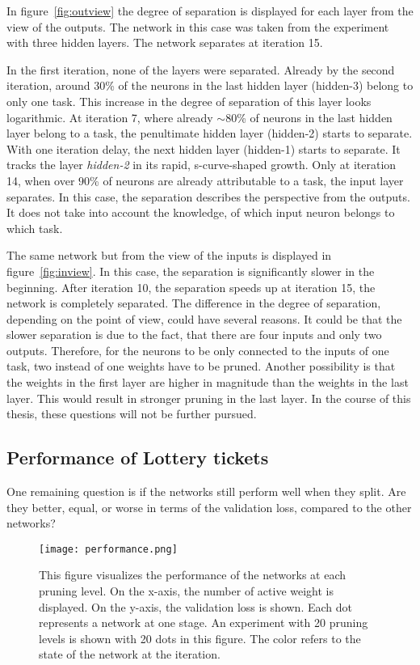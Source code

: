 In figure~\ref{fig:outview} the degree of separation is displayed for each layer from the view of the outputs.
The network in this case was taken from the experiment with three hidden layers.
The network separates at iteration 15.

In the first iteration, none of the layers were separated.
Already by the second iteration, around $30$\% of the neurons in the last hidden layer (hidden-3) belong to only one task.
This increase in the degree of separation of this layer looks logarithmic.
At iteration 7, where already $\sim80$\% of neurons in the last hidden layer belong to a task, the penultimate hidden layer (hidden-2) starts to separate.
With one iteration delay, the next hidden layer (hidden-1) starts to separate.
It tracks the layer \textit{hidden-2} in its rapid, s-curve-shaped growth.
Only at iteration 14, when over $90$\% of neurons are already attributable to a task, the input layer separates.
In this case, the separation describes the perspective from the outputs.
It does not take into account the knowledge, of which input neuron belongs to which task.

The same network but from the view of the inputs is displayed in figure~\ref{fig:inview}.
In this case, the separation is significantly slower in the beginning.
After iteration 10, the separation speeds up at iteration 15, the network is completely separated.
The difference in the degree of separation, depending on the point of view, could have several reasons.
It could be that the slower separation is due to the fact, that there are four inputs and only two outputs.
Therefore, for the neurons to be only connected to the inputs of one task, two instead of one weights have to be pruned.
Another possibility is that the weights in the first layer are higher in magnitude than the weights in the last layer.
This would result in stronger pruning in the last layer.
In the course of this thesis, these questions will not be further pursued.



\subsection{Performance of Lottery tickets}
One remaining question is if the networks still perform well when they split.
Are they better, equal, or worse in terms of the validation loss, compared to the other networks?

\begin{figure}[ht]
    \centering
    \texttt{[image: performance.png]}
    \caption{
        This figure visualizes the performance of the networks at each pruning level.
        On the x-axis, the number of active weight is displayed.
        On the y-axis, the validation loss is shown.
        Each dot represents a network at one stage.
        An experiment with 20 pruning levels is shown with 20 dots in this figure.
        The color refers to the state of the network at the iteration.
    }\label{fig:performance}
\end{figure}


